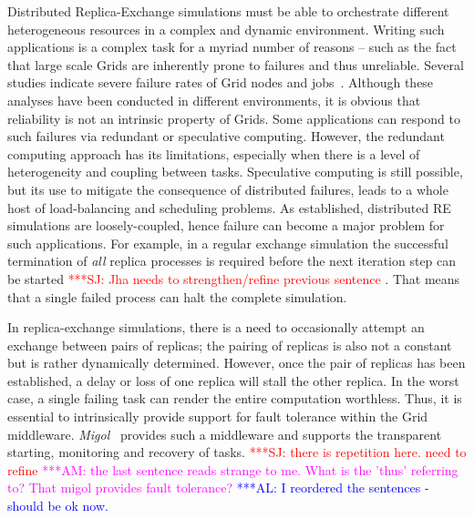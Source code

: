 \documentclass[times, 10pt, twocolumn]{article}
\newcommand{\alnote}[1]{ {\textcolor{blue} { ***AL: #1 }}}
\newcommand{\amnote}[1]{ {\textcolor{magenta} { ***AM: #1 }}}
\newcommand{\jhanote}[1]{ {\textcolor{red} { ***SJ: #1 }}}
\newcommand{\alnote}[1]{}
\newcommand{\amnote}[1]{}
\newcommand{\jhanote}[1]{}
\begin{document}
Distributed Replica-Exchange simulations %
must
be able to orchestrate different heterogeneous resources in a complex
and dynamic environment.  Writing such applications 
is a complex task for a myriad number of reasons -- such as the fact  
that large scale Grids are inherently prone to failures and thus
unreliable.  
Several studies indicate severe failure rates of Grid
nodes and  
jobs~\cite{schroeder,10.1109/E-SCIENCE.2006.93,DBLP:conf/grid/KhaliliHOSC06}.
Although these analyses have been conducted in different environments,
it is obvious that reliability is not an intrinsic property
of Grids. Some applications can respond to such failures
via redundant or speculative computing.  However, the redundant
computing approach has its limitations, especially when there is a
level of heterogeneity and coupling between tasks.  Speculative
computing is still possible, but its use to mitigate the consequence
of distributed failures, leads to a whole host of load-balancing and
scheduling problems.  As established, distributed RE simulations are
loosely-coupled, hence failure can become a major problem for such
applications.  For example, in a regular exchange simulation the
successful termination of \textit{all} replica processes is required
before the next iteration step can be started \jhanote{Jha needs to
  strengthen/refine previous sentence}. That means that a single
failed process can halt the complete simulation.

In replica-exchange simulations, there is a need to occasionally
attempt an exchange between pairs of replicas; the pairing of replicas
is also not a constant but is rather dynamically determined. However, once
the pair of replicas has been established, a delay or loss of one
replica will stall the other replica. In the worst case, a single
failing task can render the entire computation worthless.    
Thus, it is essential to intrinsically provide support
for fault tolerance within the Grid middleware.
\emph{Migol}~\cite{schnorLuckow08} provides such a
middleware and supports 
the transparent starting, monitoring and recovery of tasks.  
\jhanote{there is repetition here. need to refine} \amnote{the last
  sentence reads strange to me.  What is the 'thus' referring to?  That
  migol provides fault tolerance?}      
\alnote{I reordered the sentences - should be ok now.}
\end{document}
